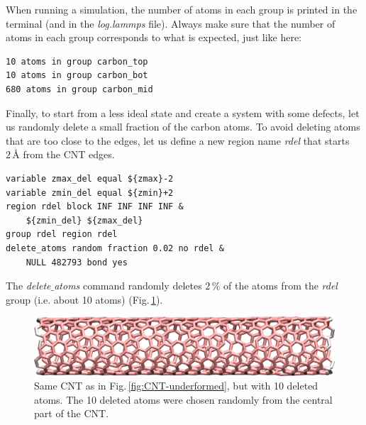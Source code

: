 \documentclass[9pt,tutorial]{livecoms}
\begin{document}
When running a simulation, the number of atoms in each group is printed in the terminal (and in the \textit{log.lammps} file). Always make sure that the number of atoms in each group corresponds to what is expected, just like here:
{\normalsize \begin{verbatim}
10 atoms in group carbon_top
10 atoms in group carbon_bot
680 atoms in group carbon_mid
\end{verbatim}}
Finally, to start from a less ideal state and create a system with some defects,
let us randomly delete a small fraction of the carbon atoms. To avoid deleting atoms that are too close to the edges, let us define a new region name \textit{rdel} that starts $2\,\text{\AA{}}$ from the CNT edges.
{\normalsize \begin{verbatim}
variable zmax_del equal ${zmax}-2
variable zmin_del equal ${zmin}+2
region rdel block INF INF INF INF &
    ${zmin_del} ${zmax_del}
group rdel region rdel
delete_atoms random fraction 0.02 no rdel &
    NULL 482793 bond yes
\end{verbatim}}
The \textit{delete$\_$atoms} command randomly deletes $2\,\%$ of the atoms from the \textit{rdel} group (i.e. about 10 atoms) (Fig.\,\ref{fig:CNT-underformed-deleted}).

\begin{figure}
\centering
\includegraphics[width=\linewidth]{CNT-underformed-deleted}
\caption{Same CNT as in Fig.\,\ref{fig:CNT-underformed}, but with 10 deleted atoms. The 10 deleted atoms were chosen randomly from the central part of the CNT.}
\label{fig:CNT-underformed-deleted}
\end{figure}
\end{document}
